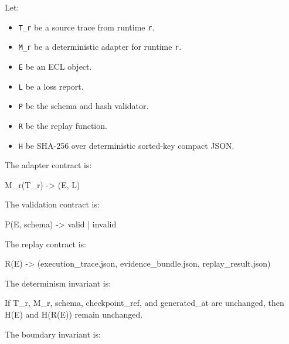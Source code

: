 \documentclass[
]{article}
\newenvironment{Shaded}{}{}
\newcommand{\NormalTok}[1]{#1}
\providecommand{\tightlist}{%
  \setlength{\itemsep}{0pt}\setlength{\parskip}{0pt}}
\begin{document}
Let:

\begin{itemize}
\tightlist
\item
  \texttt{T\_r} be a source trace from runtime \texttt{r}.
\item
  \texttt{M\_r} be a deterministic adapter for runtime \texttt{r}.
\item
  \texttt{E} be an ECL object.
\item
  \texttt{L} be a loss report.
\item
  \texttt{P} be the schema and hash validator.
\item
  \texttt{R} be the replay function.
\item
  \texttt{H} be SHA-256 over deterministic sorted-key compact JSON.
\end{itemize}

The adapter contract is:

\begin{Shaded}
\begin{Highlighting}[]
\NormalTok{M\_r(T\_r) {-}\textgreater{} (E, L)}
\end{Highlighting}
\end{Shaded}

The validation contract is:

\begin{Shaded}
\begin{Highlighting}[]
\NormalTok{P(E, schema) {-}\textgreater{} valid | invalid}
\end{Highlighting}
\end{Shaded}

The replay contract is:

\begin{Shaded}
\begin{Highlighting}[]
\NormalTok{R(E) {-}\textgreater{} (execution\_trace.json, evidence\_bundle.json, replay\_result.json)}
\end{Highlighting}
\end{Shaded}

The determinism invariant is:

\begin{Shaded}
\begin{Highlighting}[]
\NormalTok{If T\_r, M\_r, schema, checkpoint\_ref, and generated\_at are unchanged,}
\NormalTok{then H(E) and H(R(E)) remain unchanged.}
\end{Highlighting}
\end{Shaded}

The boundary invariant is:
\end{document}
